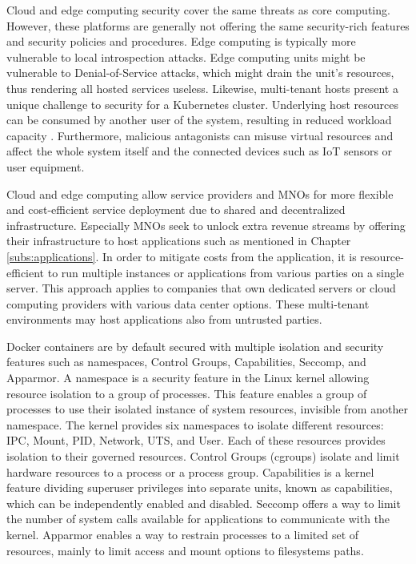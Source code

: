 Cloud and edge computing security cover the same threats as core computing. However, these platforms are generally not offering the same security-rich features and security policies and procedures. Edge computing is typically more vulnerable to local introspection attacks. Edge computing units might be vulnerable to Denial-of-Service attacks, which might drain the unit's resources, thus rendering all hosted services useless. Likewise, multi-tenant hosts present a unique challenge to security for a Kubernetes cluster. Underlying host resources can be consumed by another user of the system, resulting in reduced workload capacity \cite{Edwards2019}. Furthermore, malicious antagonists can misuse virtual resources and affect the whole system itself and the connected devices such as IoT sensors or user equipment. \cite{EdgeComputing5G}\cite{Abbas2018}

Cloud and edge computing allow service providers and MNOs for more flexible and cost-efficient service deployment due to shared and decentralized infrastructure. Especially MNOs seek to unlock extra revenue streams by offering their infrastructure to host applications such as mentioned in Chapter \ref{subs:applications}. In order to mitigate costs from the application, it is resource-efficient to run multiple instances or applications from various parties on a single server. This approach applies to companies that own dedicated servers or cloud computing providers with various data center options. These multi-tenant environments may host applications also from untrusted parties.

Docker containers are by default secured with multiple isolation and security features such as namespaces, Control Groups, Capabilities, Seccomp, and Apparmor. A namespace is a security feature in the Linux kernel allowing resource isolation to a group of processes. This feature enables a group of processes to use their isolated instance of system resources, invisible from another namespace. The kernel provides six namespaces to isolate different resources: IPC, Mount, PID, Network, UTS, and User. Each of these resources provides isolation to their governed resources. Control Groups (cgroups) isolate and limit hardware resources to a process or a process group. Capabilities is a kernel feature dividing superuser privileges into separate units, known as capabilities, which can be independently enabled and disabled. Seccomp offers a way to limit the number of system calls available for applications to communicate with the kernel. Apparmor enables a way to restrain processes to a limited set of resources, mainly to limit access and mount options to filesystems paths. \cite{Flauzac2020}\cite{Gao2017}

